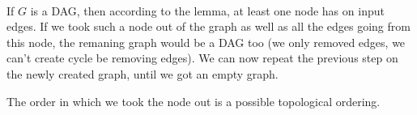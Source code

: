 
\paragraph{}
If $G$ is a DAG, then according to the lemma, at least one node has on input edges.
If we took such a node out of the graph as well as all the edges going from this node, the remaning graph would be a DAG
too (we only removed edges, we can't create cycle be removing edges).
We can now repeat the previous step on the newly created graph, until we got an empty graph.

The order in which we took the node out is a possible topological ordering.

